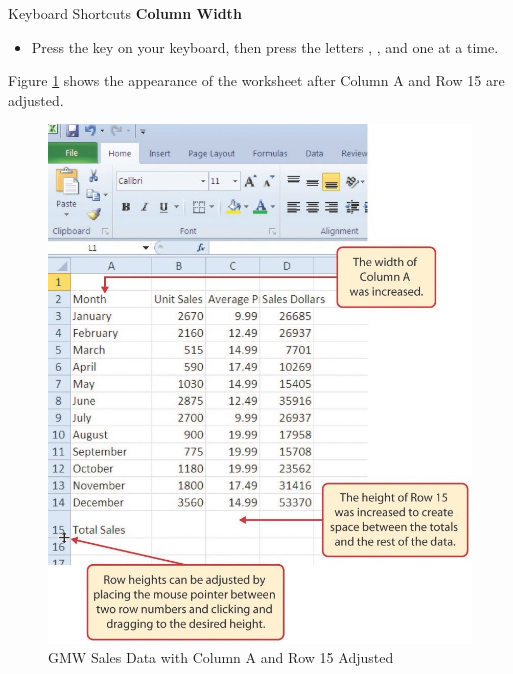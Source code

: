 \begin{center}
	\begin{shtcutbox}{Keyboard Shortcuts}
		\textbf{Column Width}
		\\
		\begin{itemize}
			\setlength{\itemsep}{0pt}
			\setlength{\parskip}{0pt}
			\setlength{\parsep}{0pt}
			
			\item Press the  key on your keyboard, then press the letters , , and  one at a time.
			
		\end{itemize}
	\end{shtcutbox}
\end{center}

Figure \ref{01:fig25} shows the appearance of the worksheet after Column A and Row 15 are adjusted.

\begin{figure}[H]
	\centering
	\includegraphics[width=\maxwidth{.95\linewidth}]{gfx/ch01_fig25}
	\caption{GMW Sales Data with Column A and Row 15 Adjusted}
	\label{01:fig25}
\end{figure}

